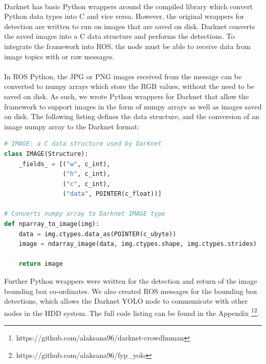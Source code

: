 \paragraph{}Darknet has basic Python wrappers around the compiled library which convert Python data types into C and vice versa. However, the original wrappers for detection are written to run on images that are saved on disk. Darknet converts the saved images into a C data structure  and performs the detections. To integrate the framework into ROS, the node must be able to receive data from image topics with  or raw  messages.

\paragraph{}In ROS Python, the JPG or PNG images received from the  message can be converted to numpy arrays which store the RGB values, without the need to be saved on disk. As such, we wrote Python wrappers for Darknet that allow the framework to support images in the form of numpy arrays as well as images saved on disk. The following listing defines the  data structure, and the conversion of an image numpy array to the Darknet format: \\



\begin{lstlisting}[language=Python, caption={Darknet IMAGE Python wrappers for seamless ROS integration.}]
# IMAGE: a C data structure used by Darknet
class IMAGE(Structure): 
	_fields_ = [("w", c_int),
				("h", c_int),
				("c", c_int),
				("data", POINTER(c_float))]
				
# Converts numpy array to Darknet IMAGE type
def nparray_to_image(img): 
	data = img.ctypes.data_as(POINTER(c_ubyte))
	image = ndarray_image(data, img.ctypes.shape, img.ctypes.strides)

	return image
\end{lstlisting}

Further Python wrappers were written for the detection and return of the image bounding box co-ordinates. We also created ROS messages for the bounding box detections, which allows the Darknet YOLO node to communicate with other nodes in the HDD system. The full code listing can be found in the Appendix \footnote{https://github.com/alaksana96/darknet-crowdhuman}\footnote{https://github.com/alaksana96/fyp\_yolo}.

